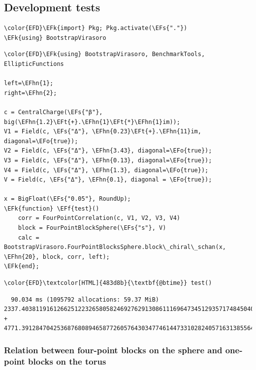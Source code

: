 \documentclass[a4paper]{article}
\numberwithin{equation}{section}
\newcommand{\EFs}[1]{\textcolor{EFs}{#1}} %
\newcommand{\EFk}[1]{\textcolor{EFk}{#1}} %
\newcommand{\EFf}[1]{\textcolor{EFf}{#1}} %
\newcommand{\EFt}[1]{\textcolor{EFt}{#1}} %
\newcommand{\EFo}[1]{\textcolor{EFo}{#1}} %
\newcommand{\EFhn}[1]{\textcolor{EFhn}{#1}} %
\begin{document}
\subsection{Development tests}
\label{sec:orgc0970a2}
\begin{Code}
\begin{Verbatim}
\color{EFD}\EFk{import} Pkg; Pkg.activate(\EFs{"."})
\EFk{using} BootstrapVirasoro
\end{Verbatim}
\end{Code}

\begin{Code}
\begin{Verbatim}
\color{EFD}\EFk{using} BootstrapVirasoro, BenchmarkTools, EllipticFunctions

left=\EFhn{1};
right=\EFhn{2};

c = CentralCharge(\EFs{"β"}, big(\EFhn{1.2}\EFt{+}.\EFhn{1}\EFt{*}\EFhn{1}im));
V1 = Field(c, \EFs{"Δ"}, \EFhn{0.23}\EFt{+}.\EFhn{11}im, diagonal=\EFo{true});
V2 = Field(c, \EFs{"Δ"}, \EFhn{3.43}, diagonal=\EFo{true});
V3 = Field(c, \EFs{"Δ"}, \EFhn{0.13}, diagonal=\EFo{true});
V4 = Field(c, \EFs{"Δ"}, \EFhn{1.3}, diagonal=\EFo{true});
V = Field(c, \EFs{"Δ"}, \EFhn{0.1}, diagonal = \EFo{true});

x = BigFloat(\EFs{"0.05"}, RoundUp);
\EFk{function} \EFf{test}()
    corr = FourPointCorrelation(c, V1, V2, V3, V4)
    block = FourPointBlockSphere(\EFs{"s"}, V)
    calc = BootstrapVirasoro.FourPointBlocksSphere.block\_chiral\_schan(x, \EFhn{20}, block, corr, left);
\EFk{end};
\end{Verbatim}
\end{Code}

\begin{Code}
\begin{Verbatim}
\color{EFD}\textcolor[HTML]{483d8b}{\textbf{@btime}} test()
\end{Verbatim}
\end{Code}

\begin{verbatim}
  90.034 ms (1095792 allocations: 59.37 MiB)
2337.403811916126625122326580582469276291308611169647345129357174845040805086673 + 4771.391284704253687680894658772605764303477461447331028240571631385564211692817im
\end{verbatim}
\subsubsection*{Relation between four-point blocks on the sphere and one-point blocks on the torus}
\label{sec:orgb547a73}
\end{document}
